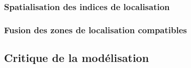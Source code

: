 \subsubsection{Spatialisation des indices de localisation}
\label{subsec:9-4-2-2}

\subsubsection{Fusion des zones de localisation compatibles}
\label{subsec:9-4-2-3}

\subsection{Critique de la modélisation}
\label{subsec:9-4-3}

